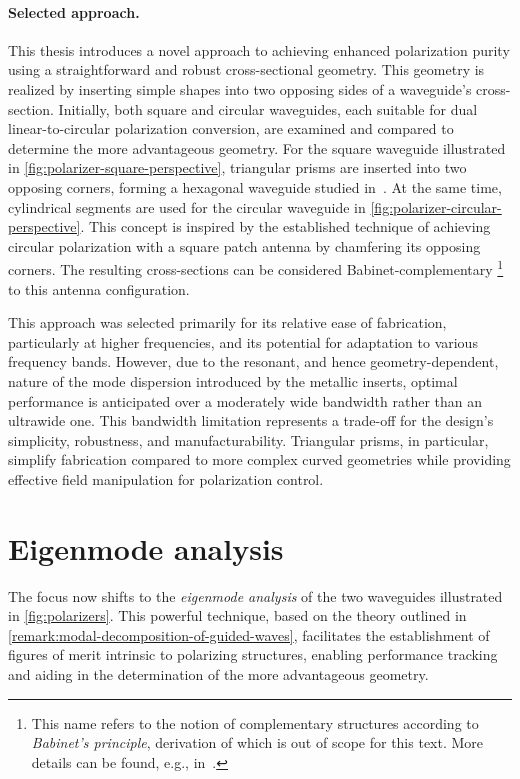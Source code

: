 \documentclass[14pt,a4paper]{ntust_report}
\begin{document}
\paragraph{Selected approach.} This thesis introduces a novel approach to achieving enhanced polarization purity using a straightforward and robust cross-sectional geometry. This geometry is realized by inserting simple shapes into two opposing sides of a waveguide's cross-section. Initially, both square and circular waveguides, each suitable for dual linear-to-circular polarization conversion, are examined and compared to determine the more advantageous geometry. For the square waveguide illustrated in \cref{fig:polarizer-square-perspective}, triangular prisms are inserted into two opposing corners, forming a hexagonal waveguide studied in~\parencite{bhardwaj-volakis:hexagonal-waveguides-new-class-of-waveguides-for-mmwave-circularly-polarized-horns}. At the same time, cylindrical segments are used for the circular waveguide in \cref{fig:polarizer-circular-perspective}. This concept is inspired by the established technique of achieving circular polarization with a square patch antenna by chamfering its opposing corners. The resulting cross-sections can be considered Babinet-complementary%
    \footnote{This name refers to the notion of complementary structures according to \emph{Babinet's principle}, derivation of which is out of scope for this text. More details can be found, e.g., in~\parencite{born-wolf:principles-of-optics}.}
to this antenna configuration.

This approach was selected primarily for its relative ease of fabrication, particularly at higher frequencies, and its potential for adaptation to various frequency bands. However, due to the resonant, and hence geometry-dependent, nature of the mode dispersion introduced by the metallic inserts, optimal performance is anticipated over a moderately wide bandwidth rather than an ultrawide one. This bandwidth limitation represents a trade-off for the design's simplicity, robustness, and manufacturability. Triangular prisms, in particular, simplify fabrication compared to more complex curved geometries while providing effective field manipulation for polarization control.

\section{Eigenmode analysis}
The focus now shifts to the \emph{eigenmode analysis} of the two waveguides illustrated in \cref{fig:polarizers}. This powerful technique, based on the theory outlined in \cref{remark:modal-decomposition-of-guided-waves}, facilitates the establishment of figures of merit intrinsic to polarizing structures, enabling performance tracking and aiding in the determination of the more advantageous geometry.
\end{document}
